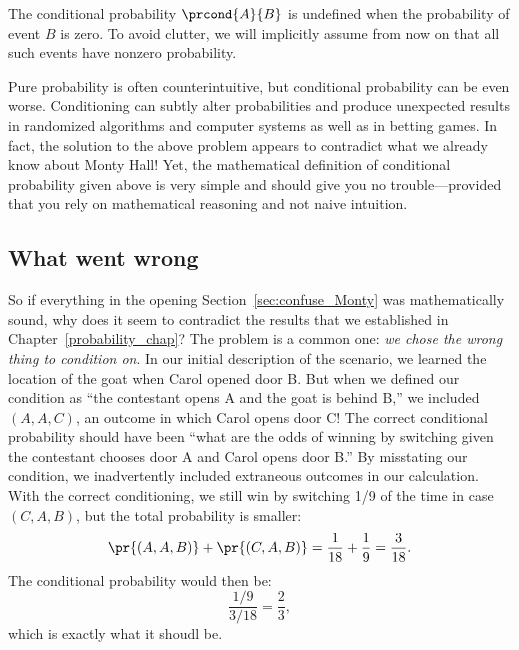 The conditional probability $\prcond{A}{B}$ is undefined when the
probability of event $B$ is zero.  \iffalse Assertions about conditional
probability can get cluttered up with uninteresting hypotheses that
conditioning events like $B$ have nonzero probability.\fi  To avoid
clutter, we will implicitly assume from now on that all such
events have nonzero probability.

Pure probability is often counterintuitive, but conditional
probability can be even worse.  Conditioning can subtly alter
probabilities and produce unexpected results in randomized algorithms
and computer systems as well as in betting games.  In fact, the
solution to the above problem appears to contradict what we already
know about Monty Hall!  Yet, the mathematical definition of
conditional probability given above is very simple and should give you
no trouble---provided that you rely on mathematical reasoning and not
naive intuition.

\subsection{What went wrong}

So if everything in the opening Section~\ref{sec:confuse_Monty} was
mathematically sound, why does it seem to contradict the results that
we established in Chapter~\ref{probability_chap}?  The problem is a
common one: \emph{we chose the wrong thing to condition on}.  In our
initial description of the scenario, we learned the location of the
goat when Carol opened door B.  But when we defined our condition as
``the contestant opens A and the goat is behind B,'' we included $(A,
A, C)$, an outcome in which Carol opens door C!  The correct
conditional probability should have been ``what are the odds of
winning by switching given the contestant chooses door A and Carol
opens door B.''  By misstating our condition, we inadvertently
included extraneous outcomes in our calculation.  With the correct
conditioning, we still win by switching 1/9 of the time in case $(C,
A, B)$, but the total probability is smaller:
\[
\pr{(A, A, B)} + \pr{(C, A, B)} = \frac{1}{18} + \frac{1}{9} = \frac{3}{18}.
\]
The conditional probability would then be:
\[
\frac{1/9}{3/18} = \frac{2}{3},
\]
which is exactly what it shoudl be.


